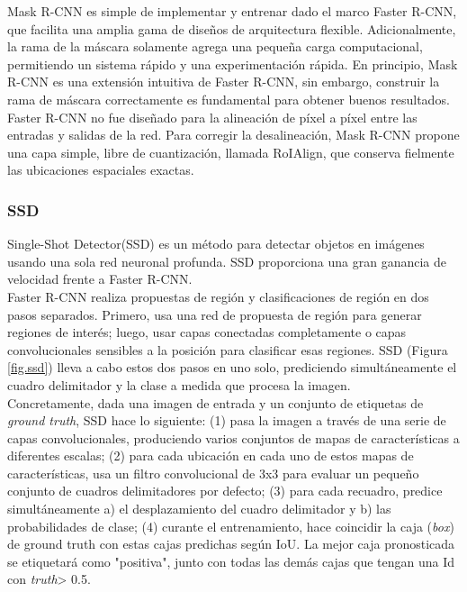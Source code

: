 \documentclass{bmvc2k}
\begin{document}
Mask R-CNN es simple de implementar y entrenar dado el marco Faster R-CNN, que facilita una amplia gama de diseños de arquitectura flexible. Adicionalmente, la rama de la máscara solamente agrega una pequeña carga computacional, permitiendo un sistema rápido y una experimentación rápida. En principio, Mask R-CNN es una extensión intuitiva de Faster R-CNN, sin embargo, construir la rama de máscara correctamente es fundamental para obtener buenos resultados.\\

Faster R-CNN no fue diseñado para la alineación de píxel a píxel entre las entradas y salidas de la red. Para corregir la desalineación, Mask R-CNN propone una capa simple, libre de cuantización, llamada RoIAlign, que conserva fielmente las ubicaciones espaciales exactas.\\

\subsubsection{SSD}

Single-Shot Detector(SSD) es un método para detectar objetos en imágenes usando una sola
red neuronal profunda. SSD proporciona una gran ganancia de velocidad frente a Faster R-CNN.\\

Faster R-CNN realiza propuestas de región y clasificaciones de región en dos pasos separados. Primero, usa una red de propuesta de región para generar regiones de interés; luego, usar capas conectadas completamente o capas convolucionales sensibles a la posición para clasificar esas regiones. SSD (Figura \ref{fig.ssd}) lleva a cabo estos dos pasos en uno solo, prediciendo simultáneamente el cuadro delimitador y la clase a medida que procesa la imagen.\\

Concretamente, dada una imagen de entrada y un conjunto de etiquetas de \textit{ground truth}, SSD hace lo siguiente: (1) pasa la imagen a través de una serie de capas convolucionales, produciendo varios conjuntos de mapas de características a diferentes escalas; (2) para cada ubicación en cada uno de estos mapas de características, usa un filtro convolucional de 3x3 para evaluar un pequeño conjunto de cuadros delimitadores por defecto; (3) para cada recuadro, predice simultáneamente a) el desplazamiento del cuadro delimitador y b) las probabilidades de clase; (4) curante el entrenamiento, hace coincidir la caja (\textit{box}) de ground truth con estas cajas predichas según IoU. La mejor caja pronosticada se etiquetará como "positiva", junto con todas las demás cajas que tengan una Id con \textit{truth}> 0.5.\\
\end{document}
